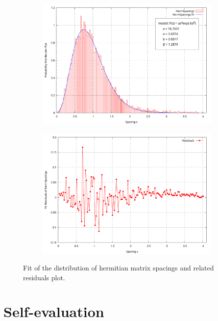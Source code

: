 \documentclass[11pt,a4paper]{article}
\begin{document}
\begin{figure}
	\centering
	\begin{subfigure}{0.9\textwidth}
		\includegraphics[width=1\linewidth]{Fit_HermSpacings.pdf}
	\end{subfigure}
	\begin{subfigure}{0.9\textwidth}
		\includegraphics[width=1\linewidth]{Res_HermSpacings.pdf}
	\end{subfigure}
	\caption{Fit of the distribution of hermitian matrix spacings and related residuals plot.}
	\label{fig:herm}
\end{figure}

\section{Self-evaluation} %
\end{document}
